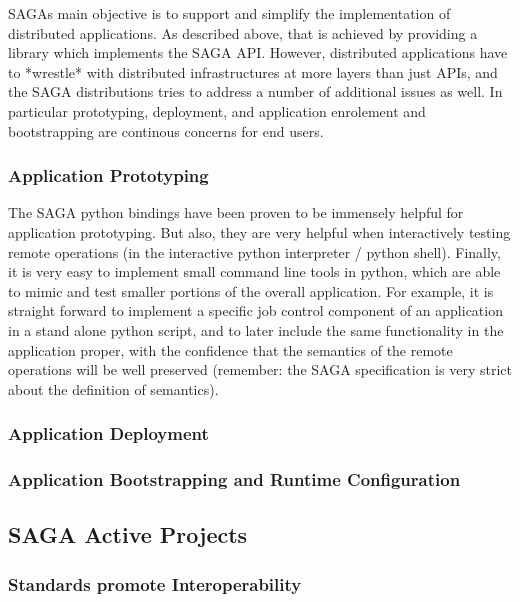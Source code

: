 \documentclass[12pt]{article}
\begin{document}
  SAGAs main objective is to support and simplify the implementation
  of distributed applications.  As described above, that is achieved
  by providing a library which implements the SAGA API.  However,
  distributed applications have to *wrestle* with distributed
  infrastructures at more layers than just APIs, and the SAGA
  distributions tries to address a number of additional issues as
  well. In particular prototyping, deployment, and application
  enrolement and bootstrapping are continous concerns for end users.

  \subsubsection*{Application Prototyping}

   The SAGA python bindings have been proven to be immensely helpful
   for application prototyping.  But also, they are very helpful when
   interactively testing remote operations (in the interactive python
   interpreter / python shell).  Finally, it is very easy to implement
   small command line tools in python, which are able to mimic and
   test smaller portions of the overall application.  For example, it
   is straight forward to implement a specific job control component
   of an application in a stand alone python script, and to later
   include the same functionality in the application proper, with the
   confidence that the semantics of the remote operations will be well
   preserved (remember: the SAGA specification is very strict about
   the definition of semantics).


  \subsubsection*{Application Deployment}


  \subsubsection*{Application Bootstrapping and Runtime Configuration}

\subsection{SAGA Active Projects}

\subsubsection{Standards promote Interoperability}
\end{document}
